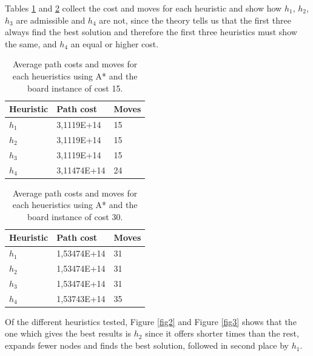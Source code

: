 \documentclass[runningheads]{llncs}
\begin{document}
Tables \ref{tab1} and \ref{tab2} collect the cost and moves for each heuristic and show how $h_1$, $h_2$, $h_3$ are admissible and $h_4$ are not,
since the theory tells us that the first three always find the best solution and therefore the first three heuristics must show the same, and $h_4$ an equal or higher cost.

\begin{table}
    \centering
    \caption{Average path costs and moves for each heueristics using A* and the board instance of cost 15.}\label{tab1}
    \begin{tabular}{|l|l|l|}
    \hline
    Heuristic & Path cost & Moves\\
    \hline
    $h_1$ & 3,1119E+14 & 15\\
    $h_2$ & 3,1119E+14 & 15\\
    $h_3$ & 3,1119E+14 & 15\\
    $h_4$ & 3,11474E+14 & 24\\
    \hline
    \end{tabular}
\end{table}

\begin{table}
    \centering
    \caption{Average path costs and moves for each heueristics using A* and the board instance of cost 30.}\label{tab2}
    \begin{tabular}{|l|l|l|}
    \hline
    Heuristic & Path cost & Moves\\
    \hline
    $h_1$ & 1,53474E+14    & 31\\
    $h_2$ & 1,53474E+14    & 31\\
    $h_3$ & 1,53474E+14    & 31\\
    $h_4$ & 1,53743E+14    & 35\\
    \hline
    \end{tabular}
\end{table}
Of the different heuristics tested, Figure \ref{fig2} and Figure \ref{fig3} shows that the one which gives the best results is $h_2$ since it offers shorter times than the rest,
expands fewer nodes and finds the best solution, followed in second place by $h_1$.
\end{document}
